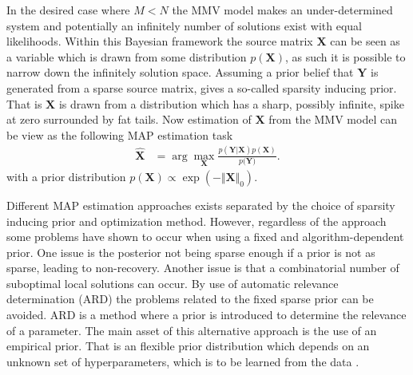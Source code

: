 In the desired case where $M < N$ the MMV model makes an under-determined system and potentially an infinitely number of solutions exist with equal likelihoods.  
Within this Bayesian framework the source matrix $\mathbf{X}$ can be seen as a variable which is drawn from some distribution $p(\mathbf{X})$, as such it is possible to narrow down the infinitely solution space. 
Assuming a prior belief that $\textbf{Y}$ is generated from a sparse source matrix, gives a so-called sparsity inducing prior. That is $\textbf{X}$ is drawn from a distribution which has a sharp, possibly infinite, spike at zero surrounded by fat tails.
Now estimation of $\textbf{X}$ from the MMV model can be view as the following MAP estimation task\cite[p. 14]{phd_wipf} 
\begin{align*}
\hat{\mathbf{X}} &= \arg \max_{\mathbf{X}} \frac{p(\mathbf{Y} \vert \mathbf{X}) p(\mathbf{X})}{p(\mathbf{Y)}}.
\end{align*}
with a prior distribution $p(\mathbf{X}) \propto \exp \left( - \Vert \mathbf{X} \Vert_0\right)$.

Different MAP estimation approaches exists separated by the choice of sparsity inducing prior and optimization method. 
However, regardless of the approach some problems have shown to occur when using a fixed and algorithm-dependent prior. One issue is the posterior not being sparse enough if a prior is not as sparse, leading to non-recovery. 
Another issue is that a combinatorial number of suboptimal local solutions can occur.
By use of automatic relevance determination (ARD) the problems related to the fixed sparse prior can be avoided\cite[p. 20]{phd_wipf}. 
ARD is a method where a prior is introduced to determine the relevance of a parameter. The main asset of this alternative approach is the use of an empirical prior. That is an flexible prior distribution which depends on an unknown set of hyperparameters, which is to be learned from the data
. 
